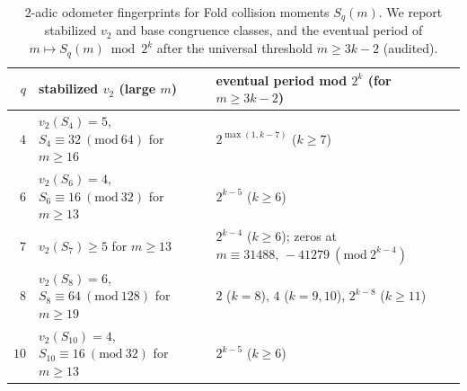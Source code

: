 \begin{table}[H]
\centering
\scriptsize
\setlength{\tabcolsep}{6pt}
\caption{2-adic odometer fingerprints for Fold collision moments $S_q(m)$. We report stabilized $v_2$ and base congruence classes, and the eventual period of $m\mapsto S_q(m)\bmod 2^k$ after the universal threshold $m\ge 3k-2$ (audited).}
\label{tab:fold_collision_moment_2adic_odometer_q4_10}
\begin{tabular}{r l l}
\toprule
$q$ & stabilized $v_2$ (large $m$) & eventual period mod $2^k$ (for $m\ge 3k-2$)\\
\midrule
$4$ & $v_2(S_4)=5$, $S_4\equiv 32\ (\mathrm{mod}\ 64)$ for $m\ge 16$ & $2^{\max(1,k-7)}$ ($k\ge 7$)\\
$6$ & $v_2(S_6)=4$, $S_6\equiv 16\ (\mathrm{mod}\ 32)$ for $m\ge 13$ & $2^{k-5}$ ($k\ge 6$)\\
$7$ & $v_2(S_7)\ge 5$ for $m\ge 13$ & $2^{k-4}$ ($k\ge 6$); zeros at $m\equiv 31488,\,-41279\ (\mathrm{mod}\ 2^{k-4})$\\
$8$ & $v_2(S_8)=6$, $S_8\equiv 64\ (\mathrm{mod}\ 128)$ for $m\ge 19$ & $2$ ($k=8$), $4$ ($k=9,10$), $2^{k-8}$ ($k\ge 11$)\\
$10$ & $v_2(S_{10})=4$, $S_{10}\equiv 16\ (\mathrm{mod}\ 32)$ for $m\ge 13$ & $2^{k-5}$ ($k\ge 6$)\\
\bottomrule
\end{tabular}
\end{table}
